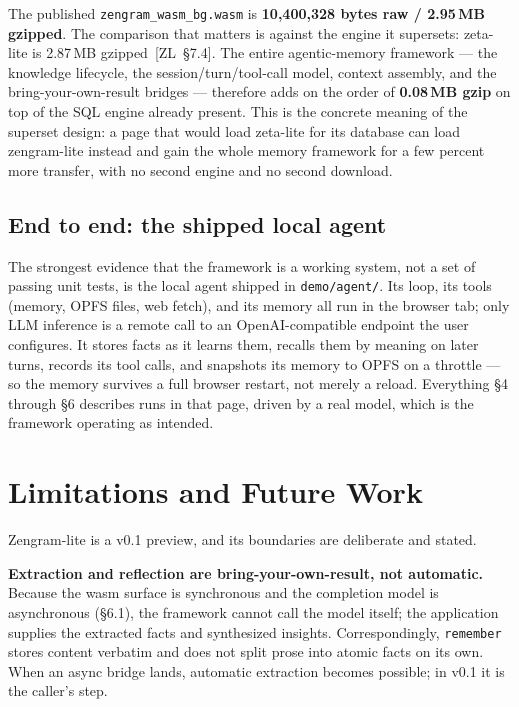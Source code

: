 \documentclass[11pt]{article}
\newcommand{\code}[1]{\texttt{#1}}
\begin{document}
The published \code{zengram\_wasm\_bg.wasm} is \textbf{10,400,328 bytes raw /
2.95\,MB gzipped}. The comparison that matters is against the engine it supersets:
zeta-lite is 2.87\,MB gzipped~[ZL~\S7.4]. The entire agentic-memory framework ---
the knowledge lifecycle, the session/turn/tool-call model, context assembly, and
the bring-your-own-result bridges --- therefore adds on the order of
\textbf{0.08\,MB gzip} on top of the SQL engine already present. This is the
concrete meaning of the superset design: a page that would load zeta-lite for its
database can load zengram-lite instead and gain the whole memory framework for a
few percent more transfer, with no second engine and no second download.

\subsection{End to end: the shipped local agent}

The strongest evidence that the framework is a working system, not a set of passing
unit tests, is the local agent shipped in \code{demo/agent/}. Its loop, its tools
(memory, OPFS files, web fetch), and its memory all run in the browser tab; only
LLM inference is a remote call to an OpenAI-compatible endpoint the user
configures. It stores facts as it learns them, recalls them by meaning on later
turns, records its tool calls, and snapshots its memory to OPFS on a throttle ---
so the memory survives a full browser restart, not merely a reload. Everything \S4
through \S6 describes runs in that page, driven by a real model, which is the
framework operating as intended.

\section{Limitations and Future Work}

Zengram-lite is a v0.1 preview, and its boundaries are deliberate and stated.

\textbf{Extraction and reflection are bring-your-own-result, not automatic.}
Because the wasm surface is synchronous and the completion model is asynchronous
(\S6.1), the framework cannot call the model itself; the application supplies the
extracted facts and synthesized insights. Correspondingly, \code{remember} stores
content verbatim and does not split prose into atomic facts on its own. When an
async bridge lands, automatic extraction becomes possible; in v0.1 it is the
caller's step.
\end{document}
